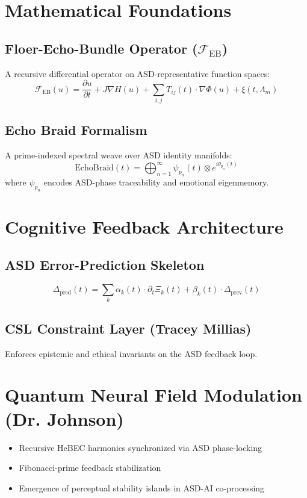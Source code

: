 \documentclass[12pt]{article}
\theoremstyle{plain}
\begin{document}
\section{Mathematical Foundations}
\subsection{Floer-Echo-Bundle Operator ($\mathcal{F}_{\text{EB}}$)}
A recursive differential operator on ASD-representative function spaces:
\begin{equation}
\mathcal{F}_{\text{EB}}(u) = \frac{\partial u}{\partial t} + J \nabla H(u) + \sum_{i,j} T_{ij}(t) \cdot \nabla \Phi(u) + \xi(t, \Lambda_m)
\end{equation}

\subsection{Echo Braid Formalism}
A prime-indexed spectral weave over ASD identity manifolds:
\begin{equation}
\text{EchoBraid}(t) = \bigoplus_{n=1}^{\infty} \psi_{p_n}(t) \otimes e^{i \theta_{p_n}(t)}
\end{equation}
where $\psi_{p_n}$ encodes ASD-phase traceability and emotional eigenmemory.

\section{Cognitive Feedback Architecture}
\subsection{ASD Error-Prediction Skeleton}
\begin{equation}
\Delta_{\text{pred}}(t) = \sum_k \alpha_k(t) \cdot \partial_t \Xi_k(t) + \beta_k(t) \cdot \Delta_{\text{prev}}(t)
\end{equation}

\subsection{CSL Constraint Layer (Tracey Millias)}
Enforces epistemic and ethical invariants on the ASD feedback loop.

\section{Quantum Neural Field Modulation (Dr. Johnson)}
\begin{itemize}
  \item Recursive HeBEC harmonics synchronized via ASD phase-locking
  \item Fibonacci-prime feedback stabilization
  \item Emergence of perceptual stability islands in ASD-AI co-processing
\end{itemize}
\end{document}
